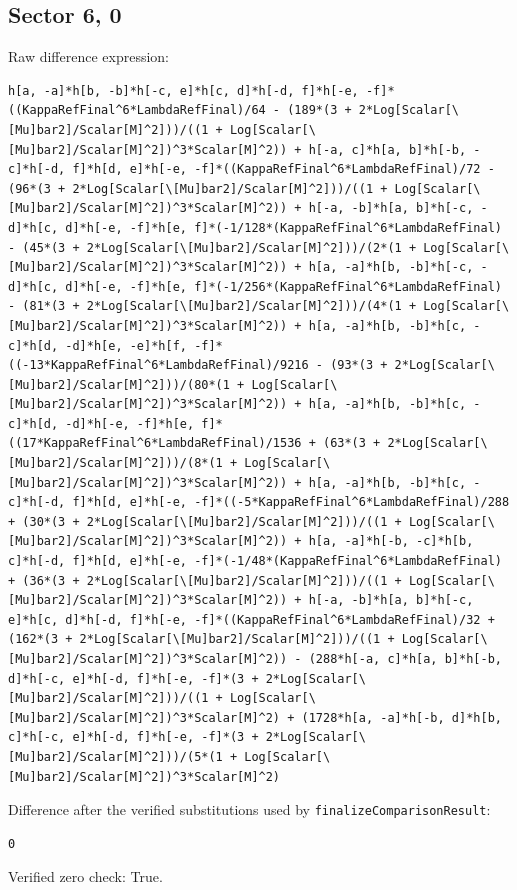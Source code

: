 \documentclass[11pt]{article}
\begin{document}
\subsection*{Sector {6, 0}}
Raw difference expression:
\begin{verbatim}
h[a, -a]*h[b, -b]*h[-c, e]*h[c, d]*h[-d, f]*h[-e, -f]*((KappaRefFinal^6*LambdaRefFinal)/64 - (189*(3 + 2*Log[Scalar[\[Mu]bar2]/Scalar[M]^2]))/((1 + Log[Scalar[\[Mu]bar2]/Scalar[M]^2])^3*Scalar[M]^2)) + h[-a, c]*h[a, b]*h[-b, -c]*h[-d, f]*h[d, e]*h[-e, -f]*((KappaRefFinal^6*LambdaRefFinal)/72 - (96*(3 + 2*Log[Scalar[\[Mu]bar2]/Scalar[M]^2]))/((1 + Log[Scalar[\[Mu]bar2]/Scalar[M]^2])^3*Scalar[M]^2)) + h[-a, -b]*h[a, b]*h[-c, -d]*h[c, d]*h[-e, -f]*h[e, f]*(-1/128*(KappaRefFinal^6*LambdaRefFinal) - (45*(3 + 2*Log[Scalar[\[Mu]bar2]/Scalar[M]^2]))/(2*(1 + Log[Scalar[\[Mu]bar2]/Scalar[M]^2])^3*Scalar[M]^2)) + h[a, -a]*h[b, -b]*h[-c, -d]*h[c, d]*h[-e, -f]*h[e, f]*(-1/256*(KappaRefFinal^6*LambdaRefFinal) - (81*(3 + 2*Log[Scalar[\[Mu]bar2]/Scalar[M]^2]))/(4*(1 + Log[Scalar[\[Mu]bar2]/Scalar[M]^2])^3*Scalar[M]^2)) + h[a, -a]*h[b, -b]*h[c, -c]*h[d, -d]*h[e, -e]*h[f, -f]*((-13*KappaRefFinal^6*LambdaRefFinal)/9216 - (93*(3 + 2*Log[Scalar[\[Mu]bar2]/Scalar[M]^2]))/(80*(1 + Log[Scalar[\[Mu]bar2]/Scalar[M]^2])^3*Scalar[M]^2)) + h[a, -a]*h[b, -b]*h[c, -c]*h[d, -d]*h[-e, -f]*h[e, f]*((17*KappaRefFinal^6*LambdaRefFinal)/1536 + (63*(3 + 2*Log[Scalar[\[Mu]bar2]/Scalar[M]^2]))/(8*(1 + Log[Scalar[\[Mu]bar2]/Scalar[M]^2])^3*Scalar[M]^2)) + h[a, -a]*h[b, -b]*h[c, -c]*h[-d, f]*h[d, e]*h[-e, -f]*((-5*KappaRefFinal^6*LambdaRefFinal)/288 + (30*(3 + 2*Log[Scalar[\[Mu]bar2]/Scalar[M]^2]))/((1 + Log[Scalar[\[Mu]bar2]/Scalar[M]^2])^3*Scalar[M]^2)) + h[a, -a]*h[-b, -c]*h[b, c]*h[-d, f]*h[d, e]*h[-e, -f]*(-1/48*(KappaRefFinal^6*LambdaRefFinal) + (36*(3 + 2*Log[Scalar[\[Mu]bar2]/Scalar[M]^2]))/((1 + Log[Scalar[\[Mu]bar2]/Scalar[M]^2])^3*Scalar[M]^2)) + h[-a, -b]*h[a, b]*h[-c, e]*h[c, d]*h[-d, f]*h[-e, -f]*((KappaRefFinal^6*LambdaRefFinal)/32 + (162*(3 + 2*Log[Scalar[\[Mu]bar2]/Scalar[M]^2]))/((1 + Log[Scalar[\[Mu]bar2]/Scalar[M]^2])^3*Scalar[M]^2)) - (288*h[-a, c]*h[a, b]*h[-b, d]*h[-c, e]*h[-d, f]*h[-e, -f]*(3 + 2*Log[Scalar[\[Mu]bar2]/Scalar[M]^2]))/((1 + Log[Scalar[\[Mu]bar2]/Scalar[M]^2])^3*Scalar[M]^2) + (1728*h[a, -a]*h[-b, d]*h[b, c]*h[-c, e]*h[-d, f]*h[-e, -f]*(3 + 2*Log[Scalar[\[Mu]bar2]/Scalar[M]^2]))/(5*(1 + Log[Scalar[\[Mu]bar2]/Scalar[M]^2])^3*Scalar[M]^2)
\end{verbatim}
Difference after the verified substitutions used by \texttt{finalizeComparisonResult}:
\begin{verbatim}
0
\end{verbatim}
Verified zero check: True.
\end{document}

